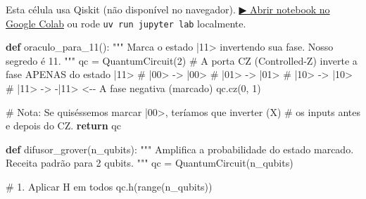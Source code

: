 \documentclass[
  brazilian,
]{report}
\newenvironment{Shaded}{\begin{snugshade}}{\end{snugshade}}
\newcommand{\BuiltInTok}[1]{\textcolor[rgb]{0.00,0.23,0.31}{#1}}
\newcommand{\CommentTok}[1]{\textcolor[rgb]{0.37,0.37,0.37}{#1}}
\newcommand{\ControlFlowTok}[1]{\textcolor[rgb]{0.00,0.23,0.31}{\textbf{#1}}}
\newcommand{\DecValTok}[1]{\textcolor[rgb]{0.68,0.00,0.00}{#1}}
\newcommand{\KeywordTok}[1]{\textcolor[rgb]{0.00,0.23,0.31}{\textbf{#1}}}
\newcommand{\NormalTok}[1]{\textcolor[rgb]{0.00,0.23,0.31}{#1}}
\newcommand{\OperatorTok}[1]{\textcolor[rgb]{0.37,0.37,0.37}{#1}}
\begin{document}
\begin{tcolorbox}[enhanced jigsaw, arc=.35mm, bottomrule=.15mm, bottomtitle=1mm, breakable, colback=white, colbacktitle=quarto-callout-warning-color!10!white, colframe=quarto-callout-warning-color-frame, coltitle=black, left=2mm, leftrule=.75mm, opacityback=0, opacitybacktitle=0.6, rightrule=.15mm, title=\textcolor{quarto-callout-warning-color}{\faExclamationTriangle}\hspace{0.5em}{⚛️ Célula Qiskit --- execute no Colab ou localmente}, titlerule=0mm, toprule=.15mm, toptitle=1mm]

Esta célula usa Qiskit (não disponível no navegador).
\href{https://colab.research.google.com/github/maxwellamaral/aula-quantum/blob/main/notebooks/06-grover.ipynb}{▶
Abrir notebook no Google Colab} ou rode \texttt{uv\ run\ jupyter\ lab}
localmente.

\begin{Shaded}
\begin{Highlighting}[]


\KeywordTok{def}\NormalTok{ oraculo\_para\_11():}
    \CommentTok{"""}
\CommentTok{    Marca o estado |11\textgreater{} invertendo sua fase.}
\CommentTok{    Nosso \textquotesingle{}segredo\textquotesingle{} é 11.}
\CommentTok{    """}
\NormalTok{    qc }\OperatorTok{=}\NormalTok{ QuantumCircuit(}\DecValTok{2}\NormalTok{)}
    \CommentTok{\# A porta CZ (Controlled{-}Z) inverte a fase APENAS do estado |11\textgreater{}}
    \CommentTok{\# |00\textgreater{} {-}\textgreater{} |00\textgreater{}}
    \CommentTok{\# |01\textgreater{} {-}\textgreater{} |01\textgreater{}}
    \CommentTok{\# |10\textgreater{} {-}\textgreater{} |10\textgreater{}}
    \CommentTok{\# |11\textgreater{} {-}\textgreater{} {-}|11\textgreater{}  \textless{}{-}{-} A fase negativa (marcado)}
\NormalTok{    qc.cz(}\DecValTok{0}\NormalTok{, }\DecValTok{1}\NormalTok{)}
    
    \CommentTok{\# Nota: Se quiséssemos marcar |00\textgreater{}, teríamos que inverter (X)}
    \CommentTok{\# os inputs antes e depois do CZ.}
    \ControlFlowTok{return}\NormalTok{ qc}

\KeywordTok{def}\NormalTok{ difusor\_grover(n\_qubits):}
    \CommentTok{"""}
\CommentTok{    Amplifica a probabilidade do estado marcado.}
\CommentTok{    Receita padrão para 2 qubits.}
\CommentTok{    """}
\NormalTok{    qc }\OperatorTok{=}\NormalTok{ QuantumCircuit(n\_qubits)}
    
    \CommentTok{\# 1. Aplicar H em todos}
\NormalTok{    qc.h(}\BuiltInTok{range}\NormalTok{(n\_qubits))}
    

\end{Highlighting}
\end{Shaded}
\end{tcolorbox}
\end{document}

